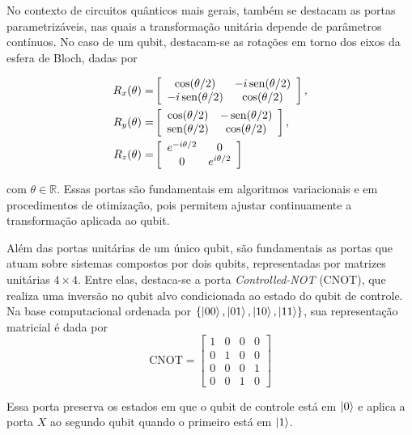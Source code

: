 {\red No contexto de circuitos quânticos mais gerais, também se destacam as portas parametrizáveis, nas quais a transformação unitária depende de parâmetros contínuos. No caso de um qubit, destacam-se as rotações em torno dos eixos da esfera de Bloch, dadas por

\begin{align}
    R_x(\theta)= &
    \left[\begin{array}{cc}
        \cos(\theta/2) & -i\operatorname{sen}(\theta/2)\\
        -i\operatorname{sen}(\theta/2) & \cos(\theta/2)
    \end{array}\right], \\
    R_y(\theta)= &
    \left[\begin{array}{cc}
        \cos(\theta/2) & -\operatorname{sen}(\theta/2)\\
        \operatorname{sen}(\theta/2) & \cos(\theta/2)
    \end{array}\right], \\
    R_z(\theta)= &
    \left[\begin{array}{cc}
        e^{-i\theta/2} & 0\\
        0 & e^{i\theta/2}
    \end{array} \right]
\end{align}

\noindent com \(\theta\in\mathbb{R}\). Essas portas são fundamentais em algoritmos variacionais e em procedimentos de otimização, pois permitem ajustar continuamente a transformação aplicada ao qubit.

Além das portas unitárias de um único qubit, são fundamentais as portas que atuam sobre sistemas compostos por dois qubits, representadas por matrizes unitárias $4\times4$. Entre elas, destaca-se a porta \textit{Controlled-NOT} (CNOT), que realiza uma inversão no qubit alvo condicionada ao estado do qubit de controle. Na base computacional ordenada por $\{\ket{00},\ket{01},\ket{10},\ket{11}\}$, sua representação matricial é dada por
$$
    \mathrm{CNOT}= \left[
    \begin{array}{cccc}
        1 & 0 & 0 & 0\\
        0 & 1 & 0 & 0\\
        0 & 0 & 0 & 1\\
        0 & 0 & 1 & 0
    \end{array} \right]
$$

Essa porta preserva os estados em que o qubit de controle está em $\ket{0}$ e aplica a porta $X$ ao segundo qubit quando o primeiro está em $\ket{1}$. }

